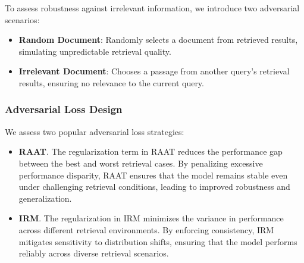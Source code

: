 

To assess robustness against irrelevant information, we introduce two adversarial scenarios:
\begin{itemize}[leftmargin=0.5cm, itemindent=0cm, itemsep=0pt]
    \item \textbf{Random Document}: Randomly selects a document from retrieved results, simulating unpredictable retrieval quality.
    \item \textbf{Irrelevant Document}: Chooses a passage from another query’s retrieval results, ensuring no relevance to the current query.
\end{itemize}


\subsubsection{Adversarial Loss Design}  
We assess two popular adversarial loss strategies:
\begin{itemize}[leftmargin=0.5cm, itemindent=0cm, itemsep=0pt]
\item \textbf{RAAT}. The regularization term in RAAT reduces the performance gap between the best and worst retrieval cases. By penalizing excessive performance disparity, RAAT ensures that the model remains stable even under challenging retrieval conditions, leading to improved robustness and generalization.
\item \textbf{IRM}. The regularization in IRM minimizes the variance in performance across different retrieval environments. By enforcing consistency, IRM mitigates sensitivity to distribution shifts, ensuring that the model performs reliably across diverse retrieval scenarios.
\end{itemize}

